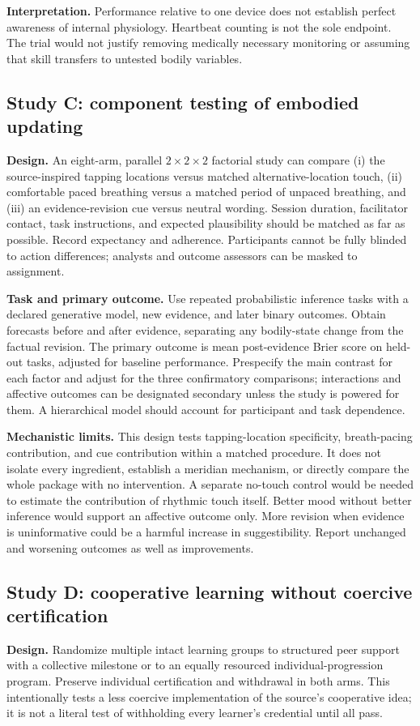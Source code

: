 \textbf{Interpretation.} Performance relative to one device does not establish perfect awareness of internal physiology. Heartbeat counting is not the sole endpoint. The trial would not justify removing medically necessary monitoring or assuming that skill transfers to untested bodily variables.

\subsection{Study C: component testing of embodied updating}
\textbf{Design.} An eight-arm, parallel $2\times2\times2$ factorial study can compare (i) the source-inspired tapping locations versus matched alternative-location touch, (ii) comfortable paced breathing versus a matched period of unpaced breathing, and (iii) an evidence-revision cue versus neutral wording. Session duration, facilitator contact, task instructions, and expected plausibility should be matched as far as possible. Record expectancy and adherence. Participants cannot be fully blinded to action differences; analysts and outcome assessors can be masked to assignment.

\textbf{Task and primary outcome.} Use repeated probabilistic inference tasks with a declared generative model, new evidence, and later binary outcomes. Obtain forecasts before and after evidence, separating any bodily-state change from the factual revision. The primary outcome is mean post-evidence Brier score on held-out tasks, adjusted for baseline performance. Prespecify the main contrast for each factor and adjust for the three confirmatory comparisons; interactions and affective outcomes can be designated secondary unless the study is powered for them. A hierarchical model should account for participant and task dependence.

\textbf{Mechanistic limits.} This design tests tapping-location specificity, breath-pacing contribution, and cue contribution within a matched procedure. It does not isolate every ingredient, establish a meridian mechanism, or directly compare the whole package with no intervention. A separate no-touch control would be needed to estimate the contribution of rhythmic touch itself. Better mood without better inference would support an affective outcome only. More revision when evidence is uninformative could be a harmful increase in suggestibility. Report unchanged and worsening outcomes as well as improvements.

\subsection{Study D: cooperative learning without coercive certification}
\textbf{Design.} Randomize multiple intact learning groups to structured peer support with a collective milestone or to an equally resourced individual-progression program. Preserve individual certification and withdrawal in both arms. This intentionally tests a less coercive implementation of the source's cooperative idea; it is not a literal test of withholding every learner's credential until all pass.

